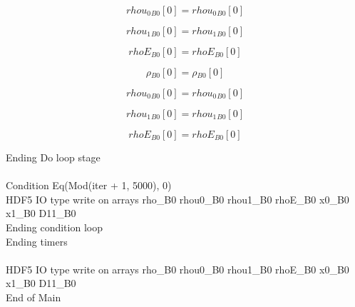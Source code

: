 \documentclass{article}
\begin{document}
\begin{dmath}{rhou_{0}{_{B0}}}[{0}] = {rhou_{0}{_{B0}}}[{0}]\end{dmath}

\begin{dmath}{rhou_{1}{_{B0}}}[{0}] = {rhou_{1}{_{B0}}}[{0}]\end{dmath}

\begin{dmath}{rhoE{_{B0}}}[{0}] = {rhoE{_{B0}}}[{0}]\end{dmath}

\begin{dmath}{\rho{_{B0}}}[{0}] = {\rho{_{B0}}}[{0}]\end{dmath}

\begin{dmath}{rhou_{0}{_{B0}}}[{0}] = {rhou_{0}{_{B0}}}[{0}]\end{dmath}

\begin{dmath}{rhou_{1}{_{B0}}}[{0}] = {rhou_{1}{_{B0}}}[{0}]\end{dmath}

\begin{dmath}{rhoE{_{B0}}}[{0}] = {rhoE{_{B0}}}[{0}]\end{dmath}

\noindent Ending Do loop stage\\
\\\noindent Condition Eq(Mod(iter + 1, 5000), 0)\\\noindent HDF5 IO type write on arrays rho_B0 rhou0_B0 rhou1_B0 rhoE_B0 x0_B0 x1_B0 D11_B0\\\noindent Ending condition loop %
\\\noindent Ending timers\\
\\\noindent HDF5 IO type write on arrays rho_B0 rhou0_B0 rhou1_B0 rhoE_B0 x0_B0 x1_B0 D11_B0\\\noindent End of Main\\
\end{document}
